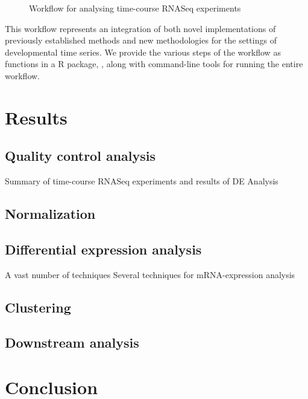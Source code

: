 \documentclass[11 pts]{article}
\newcommand{\xxx}[1]{\textcolor{red}{XXX}}
\begin{document}
\begin{figure}
\caption{Workflow for analysing time-course RNASeq experiments}
\label{fig:workflow}
\end{figure}

This workflow represents an integration of both novel implementations of previously established methods and new methodologies for the settings of developmental time series. We provide the various steps of the workflow as functions in a R package, \citettt{\xxx}, along with command-line tools for running the entire workflow. 

\section{Results}
\subsection{Quality control analysis}

\begin{table}
\caption{Summary of time-course RNASeq experiments and results of DE Analysis}
\end{table}


\subsection{Normalization}

\subsection{Differential expression analysis}

A vast number of techniques Several techniques for mRNA-expression analysis 

\subsection{Clustering}

\subsection{Downstream analysis}


\section{Conclusion}
\end{document}
